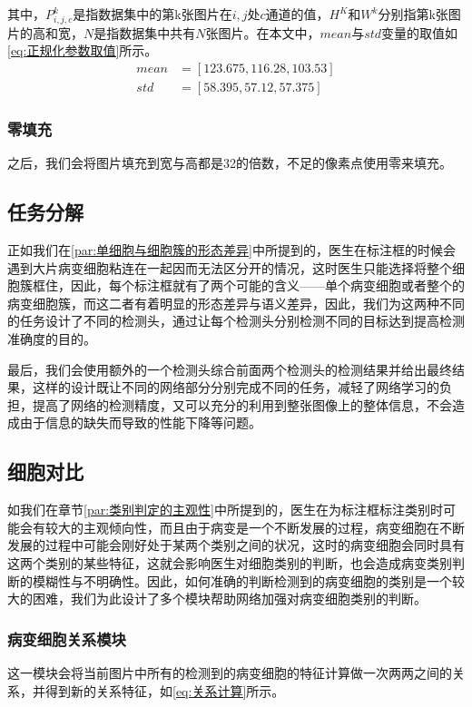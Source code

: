 \par 其中，$P_{i,j,c}^k$是指数据集中的第k张图片在$i,j$处$c$通道的值，$H^K$和$W^k$分别指第k张图片的高和宽，$N$是指数据集中共有$N$张图片。在本文中，$mean$与$std$变量的取值如\ref{eq:正规化参数取值}所示。
\begin{equation}
    \begin{aligned}
        mean&=[123.675, 116.28, 103.53]\\
        std&=[58.395, 57.12, 57.375]
    \end{aligned}
    \label{eq:正规化参数取值}
\end{equation}

\subsubsection{零填充}
\par 之后，我们会将图片填充到宽与高都是32的倍数，不足的像素点使用零来填充。
\subsection{任务分解}
\par 正如我们在\ref{par:单细胞与细胞簇的形态差异}中所提到的，医生在标注框的时候会遇到大片病变细胞粘连在一起因而无法区分开的情况，这时医生只能选择将整个细胞簇框住，因此，每个标注框就有了两个可能的含义——单个病变细胞或者整个的病变细胞簇，而这二者有着明显的形态差异与语义差异，因此，我们为这两种不同的任务设计了不同的检测头，通过让每个检测头分别检测不同的目标达到提高检测准确度的目的。
\par 最后，我们会使用额外的一个检测头综合前面两个检测头的检测结果并给出最终结果，这样的设计既让不同的网络部分分别完成不同的任务，减轻了网络学习的负担，提高了网络的检测精度，又可以充分的利用到整张图像上的整体信息，不会造成由于信息的缺失而导致的性能下降等问题。
\subsection{细胞对比}
\par 如我们在章节\ref{par:类别判定的主观性}中所提到的，医生在为标注框标注类别时可能会有较大的主观倾向性，而且由于病变是一个不断发展的过程，病变细胞在不断发展的过程中可能会刚好处于某两个类别之间的状况，这时的病变细胞会同时具有这两个类别的某些特征，这就会影响医生对细胞类别的判断，也会造成病变类别判断的模糊性与不明确性。因此，如何准确的判断检测到的病变细胞的类别是一个较大的困难，我们为此设计了多个模块帮助网络加强对病变细胞类别的判断。
\subsubsection{病变细胞关系模块}
\par 这一模块会将当前图片中所有的检测到的病变细胞的特征计算做一次两两之间的关系，并得到新的关系特征，如\ref{eq:关系计算}所示。

